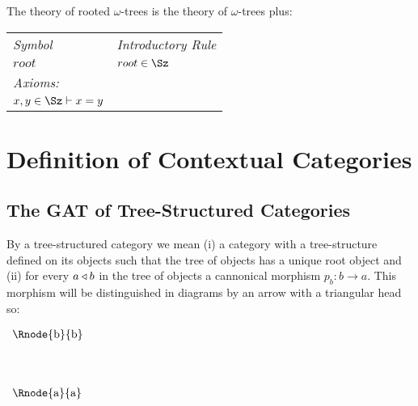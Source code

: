\documentclass[10pt,a4paper]{scrartcl}
\begin{document}
\noindent
The theory of rooted $\omega$-trees is the theory of $\omega$-trees plus: \\

\vspace{0.03cm} 
\begin{tabular}{>{\itshape}l l}
Symbol & \itshape{Introductory Rule} \\
$root$ & $\ofT{root}{\Sz}$ \\
\itshape{Axioms}:  \\
$\ofT{x,y}{\Sz} \tstyle x = y$
\end{tabular} 

\section{Definition of Contextual Categories}
\subsection {The GAT of Tree-Structured Categories}

By a tree-structured category we mean (i) a category with a tree-structure defined on its objects such that the tree of objects has a unique root object and (ii) for every $a \triangleleft b$ in the tree of objects  a cannonical morphism $p_b:b \rightarrow a$. This morphism will be distinguished in diagrams by an arrow with  
a triangular head so:

\begin{center}
$
\begin{array}{p{2cm}p{0.5cm}p{0.5cm}p{0.5cm}}
\Rnode{b}{b}& \\ [1.4cm]
\Rnode{a}{a} \\
\end{array}
$

\end{center}

\newcommand{\Obi}[1]{\Ob_{#1}}
\newcommand{\Homij}[2]{\Hom_{#1,#2}}
\newcommand{\ofObi}[2]{#1 \bbin{#2}{\Ob}}
\newcommand{\HomijBar}[4]{\Homij{#1}{#2}(#3,#4)}
\newcommand{\ofHomij}[5]{\ofT{#1}{\HomijBar{#2}{#3}{#4}{#5}}}
\newcommand{\HomijBarFt}[4]{\Homij{#1}{#2}(#3,\ft{#4})}
\newcommand{\ofHomiBarFt}[4]{\ofT{#1}{\HomijBarFt{#2}{#2-1}{#3}{#4}}}
\end{document}
